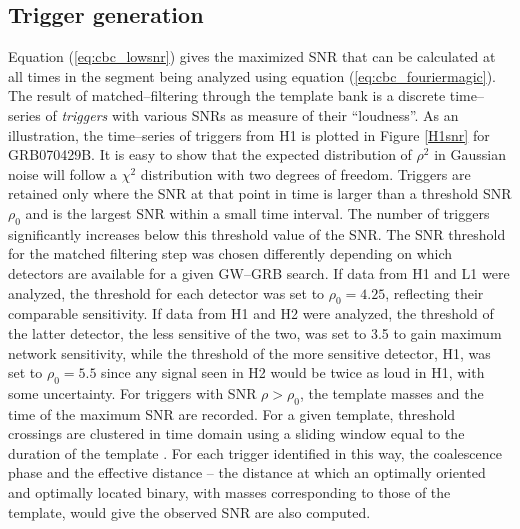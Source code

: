 \subsection{Trigger generation}
Equation (\ref{eq:cbc_lowsnr}) gives the maximized SNR that can be calculated at all times in the segment being analyzed using equation (\ref{eq:cbc_fouriermagic}). The result of matched--filtering through the template bank is a discrete time--series of \emph{triggers} with various SNRs as measure of their ``loudness''. As an illustration, the time--series of triggers from H1 is plotted in Figure \ref{H1snr} for GRB070429B. It is easy to show that the expected distribution of $\rho^2$ in Gaussian noise will follow a $\chi^2$ distribution with two degrees of freedom. Triggers are retained only where the SNR at that point in time is larger than a threshold SNR $\rho_0$ and is the largest SNR within a small time interval. The number of triggers significantly increases below this threshold value of the SNR. The SNR threshold for the matched filtering step was chosen differently depending on which detectors are available for a given GW--GRB search. If data from H1 and L1 were analyzed, the threshold for each detector was set to $\rho_0 = 4.25$, reflecting their comparable sensitivity. If data from H1 and H2 were analyzed, the threshold of the latter detector, the less sensitive of the two, was set to 3.5 to gain maximum network sensitivity, while the threshold of the more sensitive detector, H1, was set to $\rho_0 = 5.5$ since any signal seen in H2 would be twice as loud in H1, with some uncertainty. For triggers with SNR $\rho > \rho_0$, the template masses and the time of the maximum SNR are recorded. For a given template, threshold crossings are clustered in time domain using a sliding window equal to the duration of the template \cite{Allen:2004gu}. For each trigger identified in this way, the coalescence phase and the effective distance -- the distance at which an optimally oriented and optimally located binary, with masses corresponding to those of the template, would give the observed SNR are also computed.

